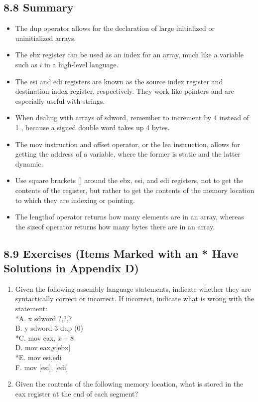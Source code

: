 \documentclass[10pt]{article}
\begin{document}
\subsection*{8.8 Summary}
\begin{itemize}
  \item The dup operator allows for the declaration of large initialized or uninitialized arrays.
  \item The ebx register can be used as an index for an array, much like a variable such as $i$ in a high-level language.
  \item The esi and edi registers are known as the source index register and destination index register, respectively. They work like pointers and are especially useful with strings.
  \item When dealing with arrays of sdword, remember to increment by 4 instead of 1 , because a signed double word takes up 4 bytes.
  \item The mov instruction and offset operator, or the lea instruction, allows for getting the address of a variable, where the former is static and the latter dynamic.
  \item Use square brackets [] around the ebx, esi, and edi registers, not to get the contents of the register, but rather to get the contents of the memory location to which they are indexing or pointing.
  \item The lengthof operator returns how many elements are in an array, whereas the sizeof operator returns how many bytes there are in an array.
\end{itemize}

\subsection*{8.9 Exercises (Items Marked with an * Have Solutions in Appendix D)}
\begin{enumerate}
  \item Given the following assembly language statements, indicate whether they are syntactically correct or incorrect. If incorrect, indicate what is wrong with the statement:\\
*A. x sdword ?,?,?\\
B. y sdword 3 dup (0)\\
*C. mov eax, $x+8$\\[0pt]
D. mov eax,y[ebx]\\
*E. mov esi,edi\\[0pt]
F. mov [esi], [edi]
  \item Given the contents of the following memory location, what is stored in the eax register at the end of each segment?
\end{enumerate}
\end{document}
